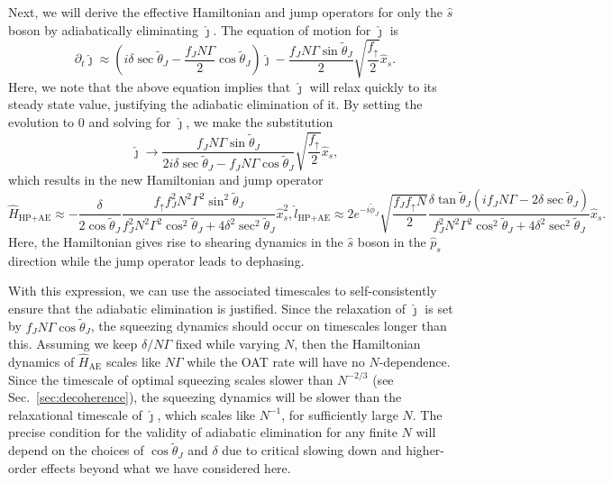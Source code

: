 Next, we will derive the effective Hamiltonian and jump operators for only the $\hat s$ boson by adiabatically eliminating $\hat \jmath$. The equation of motion for $ \hat \jmath $ is
\begin{equation}
    \partial_t \hat \jmath \approx \left(i \delta \sec \tilde{\theta}_J - \frac{f_J N \Gamma}{2} \cos \tilde{\theta}_J \right) \hat \jmath  - \frac{f_J N \Gamma \sin \tilde{\theta}_J}{2}  \sqrt{\frac{f_{\uparrow}}{2}} \hat x_s.
\end{equation}
Here, we note that the above equation implies that $\hat \jmath$ will relax quickly to its steady state value, justifying the adiabatic elimination of it. By setting the evolution to 0 and solving for $\hat \jmath$, we make the substitution
\begin{equation}
    \hat \jmath \to \frac{f_J N \Gamma \sin \tilde{\theta}_J}{2 i \delta \sec \tilde{\theta}_J - f_J N \Gamma \cos \tilde{\theta}_J} \sqrt{\frac{f_{\uparrow}}{2}} \hat x_s,
\end{equation}
which results in the new Hamiltonian and jump operator
\begin{subequations}
    \begin{equation}
        \hat H_{\text{HP+AE}} \approx -\frac{\delta}{2 \cos \tilde{\theta}_J} \frac{ f_\uparrow f_J^2 N^2 \Gamma^2 \sin^2 \tilde{\theta}_J}{f_J^2 N^2 \Gamma^2 \cos^2 \tilde{\theta}_J + 4 \delta^2 \sec^2 \tilde{\theta}_J} \hat{x}_s^2,
    \end{equation}
    \begin{equation}
        \hat{l}_{\text{HP+AE}} \approx 2 e^{-i \tilde{\phi}_J} \sqrt{\frac{f_J f_{\uparrow} N}{2}} \frac{\delta \tan \tilde{\theta}_J (i f_J N \Gamma - 2 \delta \sec \tilde{\theta}_J) }{f_J^2 N^2 \Gamma^2 \cos^2 \tilde{\theta}_J + 4 \delta^2 \sec^2 \tilde{\theta}_J} \hat x_s.
    \end{equation}
\end{subequations}
Here, the Hamiltonian gives rise to shearing dynamics in the $\hat s$ boson in the $\hat p_s$ direction while the jump operator leads to dephasing. 

With this expression, we can use the associated timescales to self-consistently ensure that the adiabatic elimination is justified. Since the relaxation of $\hat \jmath$ is set by $f_J N \Gamma \cos \tilde{\theta}_J$, the squeezing dynamics should occur on timescales longer than this. Assuming we keep $\delta/N \Gamma$ fixed while varying $N$, then the Hamiltonian dynamics of $\hat H_{\text{AE}}$ scales like $N \Gamma$ while the OAT rate will have no $N$-dependence. Since the timescale of optimal squeezing scales slower than $N^{-2/3}$ (see Sec.~\ref{sec:decoherence}), the squeezing dynamics will be slower than the relaxational timescale of $\hat \jmath$, which scales like $N^{-1}$, for sufficiently large $N$. The precise condition for the validity of adiabatic elimination for any finite $N$ will depend on the choices of $\cos \tilde{\theta}_J$ and $\delta$ due to critical slowing down and higher-order effects beyond what we have considered here.

